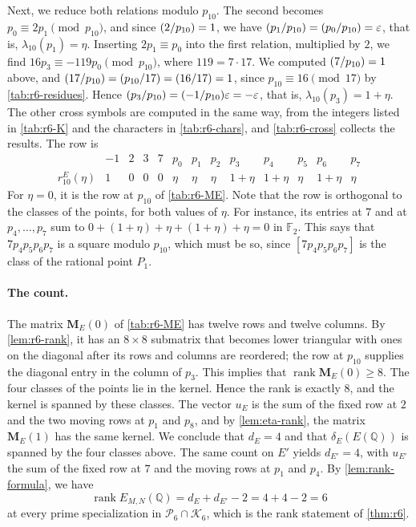 \documentclass[12pt,oneside,openany]{book}
\theoremstyle{definition}
\theoremstyle{plain}
\numberwithin{equation}{chapter}
\theoremstyle{plain}
\theoremstyle{definition}
\theoremstyle{remark}
\newcommand{\Q}{\mathbb Q}
\newcommand{\F}{\mathbb F}
\DeclareMathOperator{\rk}{rank}
\newcommand{\leg}[2]{\mathchoice{\left(\frac{#1}{#2}\right)}{(#1/#2)}{(#1/#2)}{(#1/#2)}}
\newcommand{\sq}[1]{[#1]}
\newcommand{\cP}{\mathcal P}
\newcommand{\cK}{\mathcal K}
\newcommand{\eps}{\varepsilon}
\begin{document}
Next, we reduce both relations modulo $p_{10}$. The second becomes $p_0\equiv2p_1\pmod{p_{10}}$, and since $\leg2{p_{10}}=1$, we have $\leg{p_1}{p_{10}}=\leg{p_0}{p_{10}}=\eps$, that is, $\lambda_{10}(p_1)=\eta$. Inserting $2p_1\equiv p_0$ into the first relation, multiplied by $2$, we find $16p_3\equiv-119p_0\pmod{p_{10}}$, where $119=7\cdot17$. We computed $\leg7{p_{10}}=1$ above, and $\leg{17}{p_{10}}=\leg{p_{10}}{17}=\leg{16}{17}=1$, since $p_{10}\equiv16\pmod{17}$ by \cref{tab:r6-residues}. Hence $\leg{p_3}{p_{10}}=\leg{-1}{p_{10}}\eps=-\eps$, that is, $\lambda_{10}(p_3)=1+\eta$. The other cross symbols are computed in the same way, from the integers listed in \cref{tab:r6-K} and the characters in \cref{tab:r6-chars}, and \cref{tab:r6-cross} collects the results. The row is
\begin{equation*}
\begin{array}{c|cccc|cccccccc}
 & -1 & 2 & 3 & 7 & p_0 & p_1 & p_2 & p_3 & p_4 & p_5 & p_6 & p_7\\
\hline
r^E_{10}(\eta) & 1 & 0 & 0 & 0 & \eta & \eta & \eta & 1+\eta & 1+\eta & \eta & 1+\eta & \eta
\end{array}
\end{equation*}
For $\eta=0$, it is the row at $p_{10}$ of \cref{tab:r6-ME}. Note that the row is orthogonal to the classes of the points, for both values of $\eta$. For instance, its entries at $7$ and at $p_4,\dots,p_7$ sum to $0+(1+\eta)+\eta+(1+\eta)+\eta=0$ in $\F_2$. This says that $7p_4p_5p_6p_7$ is a square modulo $p_{10}$, which must be so, since $\sq{7p_4p_5p_6p_7}$ is the class of the rational point $P_1$.

\paragraph{The count.} The matrix $\mathbf M_E(0)$ of \cref{tab:r6-ME} has twelve rows and twelve columns. By \cref{lem:r6-rank}, it has an $8\times8$ submatrix that becomes lower triangular with ones on the diagonal after its rows and columns are reordered; the row at $p_{10}$ supplies the diagonal entry in the column of $p_3$. This implies that $\rk\mathbf M_E(0)\ge8$. The four classes of the points lie in the kernel. Hence the rank is exactly $8$, and the kernel is spanned by these classes. The vector $u_E$ is the sum of the fixed row at $2$ and the two moving rows at $p_1$ and $p_8$, and by \cref{lem:eta-rank}, the matrix $\mathbf M_E(1)$ has the same kernel. We conclude that $d_E=4$ and that $\delta_E(E(\Q))$ is spanned by the four classes above. The same count on $E'$ yields $d_{E'}=4$, with $u_{E'}$ the sum of the fixed row at $7$ and the moving rows at $p_1$ and $p_4$. By \cref{lem:rank-formula}, we have
\begin{equation*}
\rk E_{M,N}(\Q)=d_E+d_{E'}-2=4+4-2=6
\end{equation*}
at every prime specialization in $\cP_6\cap\cK_6$, which is the rank statement of \cref{thm:r6}.
\end{document}
